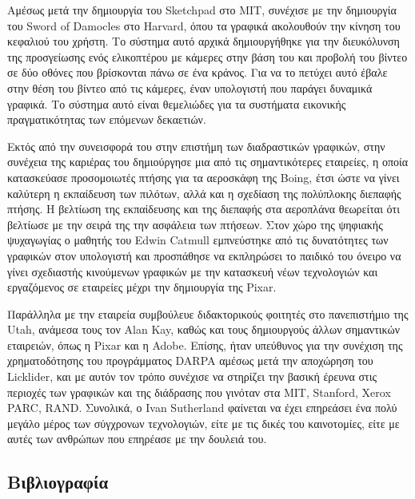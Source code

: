 \documentclass[
]{article}
\newlength{\cslhangindent}
\newlength{\cslentryspacingunit} %
\newenvironment{CSLReferences}[2] %
 {%
  \setlength{\parindent}{0pt}
  \ifodd #1
  \let\oldpar\par
  \def\par{\hangindent=\cslhangindent\oldpar}
  \fi
  \setlength{\parskip}{#2\cslentryspacingunit}
 }%
 {}
\begin{document}
Αμέσως μετά την δημιουργία του Sketchpad στο MIT, συνέχισε με την
δημιουργία του Sword of Damocles στο Harvard, όπου τα γραφικά ακολουθούν
την κίνηση του κεφαλιού του χρήστη. Το σύστημα αυτό αρχικά δημιουργήθηκε
για την διευκόλυνση της προσγείωσης ενός ελικοπτέρου με κάμερες στην
βάση του και προβολή του βίντεο σε δύο οθόνες που βρίσκονται πάνω σε ένα
κράνος. Για να το πετύχει αυτό έβαλε στην θέση του βίντεο από τις
κάμερες, έναν υπολογιστή που παράγει δυναμικά γραφικά. Το σύστημα αυτό
είναι θεμελιώδες για τα συστήματα εικονικής πραγματικότητας των επόμενων
δεκαετιών.

Εκτός από την συνεισφορά του στην επιστήμη των διαδραστικών γραφικών,
στην συνέχεια της καριέρας του δημιούργησε μια από τις σημαντικότερες
εταιρείες, η οποία κατασκεύασε προσομοιωτές πτήσης για τα αεροσκάφη της
Boing, έτσι ώστε να γίνει καλύτερη η εκπαίδευση των πιλότων, αλλά και η
σχεδίαση της πολύπλοκης διεπαφής πτήσης. Η βελτίωση της εκπαίδευσης και
της διεπαφής στα αεροπλάνα θεωρείται ότι βελτίωσε με την σειρά της την
ασφάλεια των πτήσεων. Στον χώρο της ψηφιακής ψυχαγωγίας ο μαθητής του
Edwin Catmull εμπνεύστηκε από τις δυνατότητες των γραφικών στον
υπολογιστή και προσπάθησε να εκπληρώσει το παιδικό του όνειρο να γίνει
σχεδιαστής κινούμενων γραφικών με την κατασκευή νέων τεχνολογιών και
εργαζόμενος σε εταιρείες μέχρι την δημιουργία της Pixar.

Παράλληλα με την εταιρεία συμβούλευε διδακτορικούς φοιτητές στο
πανεπιστήμιο της Utah, ανάμεσα τους τον Alan Kay, καθώς και τους
δημιουργούς άλλων σημαντικών εταιρειών, όπως η Pixar και η Adobe.
Επίσης, ήταν υπεύθυνος για την συνέχιση της χρηματοδότησης του
προγράμματος DARPA αμέσως μετά την αποχώρηση του Licklider, και με αυτόν
τον τρόπο συνέχισε να στηρίζει την βασική έρευνα στις περιοχές των
γραφικών και της διάδρασης που γινόταν στα MIT, Stanford, Xerox PARC,
RAND. Συνολικά, ο Ivan Sutherland φαίνεται να έχει επηρεάσει ένα πολύ
μεγάλο μέρος των σύγχρονων τεχνολογιών, είτε με τις δικές του
καινοτομίες, είτε με αυτές των ανθρώπων που επηρέασε με την δουλειά του.

\hypertarget{ux3b2ux3b9ux3b2ux3bbux3b9ux3bfux3b3ux3c1ux3b1ux3c6ux3afux3b1}{%
\subsection*{Βιβλιογραφία}\label{ux3b2ux3b9ux3b2ux3bbux3b9ux3bfux3b3ux3c1ux3b1ux3c6ux3afux3b1}}

\hypertarget{refs}{}
\begin{CSLReferences}{0}{0}
\end{CSLReferences}
\end{document}
